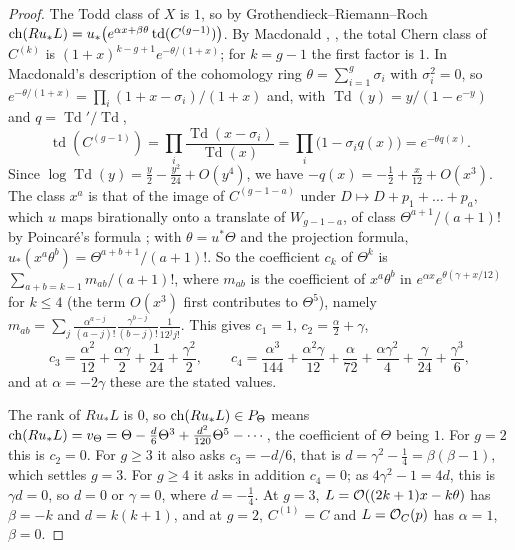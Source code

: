 \begin{proof}
The Todd class of $X$ is $1$, so by Grothendieck--Riemann--Roch
$\operatorname{ch}(Ru_{*}L)=u_{*}\bigl(e^{\alpha x+\beta\theta}\operatorname{td}(C^{(g-1)})\bigr)$.
By Macdonald \cite{Mac62}, \cite[Chapter~VII, Section~5]{ACGH85}, the total
Chern class of $C^{(k)}$ is $(1+x)^{k-g+1}e^{-\theta/(1+x)}$; for $k=g-1$ the
first factor is $1$. In Macdonald's description of the cohomology ring
$\theta=\sum_{i=1}^{g}\sigma_{i}$ with $\sigma_{i}^{2}=0$, so
$e^{-\theta/(1+x)}=\prod_{i}(1+x-\sigma_{i})/(1+x)$ and, with
$\operatorname{Td}(y)=y/(1-e^{-y})$ and $q=\operatorname{Td}'/\operatorname{Td}$,
\[
  \operatorname{td}(C^{(g-1)})=\prod_{i}\frac{\operatorname{Td}(x-\sigma_{i})}
  {\operatorname{Td}(x)}=\prod_{i}\bigl(1-\sigma_{i}q(x)\bigr)
  =e^{-\theta q(x)}.
\]
Since $\log\operatorname{Td}(y)=\frac y2-\frac{y^{2}}{24}+O(y^{4})$, we have
$-q(x)=-\frac12+\frac{x}{12}+O(x^{3})$. The class $x^{a}$ is that of the image
of $C^{(g-1-a)}$ under $D\mapsto D+p_{1}+\dots+p_{a}$, which $u$ maps
birationally onto a translate of $W_{g-1-a}$, of class
$\Theta^{a+1}/(a+1)!$ by Poincar\'e's formula
\cite[Chapter~I, Section~5]{ACGH85}; with $\theta=u^{*}\Theta$ and the projection
formula, $u_{*}(x^{a}\theta^{b})=\Theta^{a+b+1}/(a+1)!$. So the coefficient
$c_{k}$ of $\Theta^{k}$ is $\sum_{a+b=k-1}m_{ab}/(a+1)!$, where $m_{ab}$ is the
coefficient of $x^{a}\theta^{b}$ in $e^{\alpha x}e^{\theta(\gamma+x/12)}$ for
$k\le4$ (the term $O(x^{3})$ first contributes to $\Theta^{5}$), namely
$m_{ab}=\sum_{j}\frac{\alpha^{a-j}}{(a-j)!}\frac{\gamma^{b-j}}{(b-j)!}
\frac{1}{12^{j}j!}$. This gives $c_{1}=1$, $c_{2}=\frac{\alpha}{2}+\gamma$,
\[
  c_{3}=\frac{\alpha^{2}}{12}+\frac{\alpha\gamma}{2}+\frac{1}{24}+\frac{\gamma^{2}}{2},
  \qquad
  c_{4}=\frac{\alpha^{3}}{144}+\frac{\alpha^{2}\gamma}{12}+\frac{\alpha}{72}
  +\frac{\alpha\gamma^{2}}{4}+\frac{\gamma}{24}+\frac{\gamma^{3}}{6},
\]
and at $\alpha=-2\gamma$ these are the stated values.

The rank of $Ru_{*}L$ is $0$, so $\operatorname{ch}(Ru_{*}L)\in P_{\Theta}$ means
$\operatorname{ch}(Ru_{*}L)=v_{\Theta}=\Theta-\frac d6\Theta^{3}+\frac{d^{2}}{120}\Theta^{5}-\cdots$,
the coefficient of $\Theta$ being $1$. For $g=2$ this is $c_{2}=0$. For
$g\ge3$ it also asks $c_{3}=-d/6$, that is $d=\gamma^{2}-\frac14=\beta(\beta-1)$,
which settles $g=3$. For $g\ge4$ it asks in addition $c_{4}=0$; as
$4\gamma^{2}-1=4d$, this is $\gamma d=0$, so $d=0$ or $\gamma=0$, where
$d=-\frac14$. At $g=3$, $L=\mathcal{O}((2k+1)x-k\theta)$ has $\beta=-k$ and
$d=k(k+1)$, and at $g=2$, $C^{(1)}=C$ and $L=\mathcal{O}_{C}(p)$ has $\alpha=1$,
$\beta=0$.
\end{proof}


